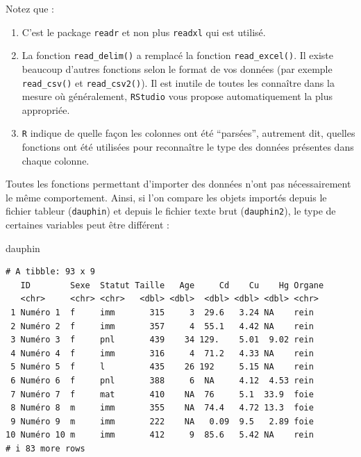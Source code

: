 \documentclass[
  a4paper,
  DIV=11,
  numbers=noendperiod,
  oneside]{scrreprt}
\newenvironment{Shaded}{}{}
\newcommand{\NormalTok}[1]{\textcolor[rgb]{0.14,0.16,0.18}{#1}}
\providecommand{\tightlist}{%
  \setlength{\itemsep}{0pt}\setlength{\parskip}{0pt}}\usepackage{longtable,booktabs,array}
\begin{document}
Notez que :

\begin{enumerate}
\def\labelenumi{\arabic{enumi}.}
\tightlist
\item
  C'est le package \texttt{readr} et non plus \texttt{readxl} qui est
  utilisé.
\item
  La fonction \texttt{read\_delim()} a remplacé la fonction
  \texttt{read\_excel()}. Il existe beaucoup d'autres fonctions selon le
  format de vos données (par exemple \texttt{read\_csv()} et
  \texttt{read\_csv2()}). Il est inutile de toutes les connaître dans la
  mesure où généralement, \texttt{RStudio} vous propose automatiquement
  la plus appropriée.
\item
  \texttt{R} indique de quelle façon les colonnes ont été ``parsées'',
  autrement dit, quelles fonctions ont été utilisées pour reconnaître le
  type des données présentes dans chaque colonne.
\end{enumerate}

Toutes les fonctions permettant d'importer des données n'ont pas
nécessairement le même comportement. Ainsi, si l'on compare les objets
importés depuis le fichier tableur (\texttt{dauphin}) et depuis le
fichier texte brut (\texttt{dauphin2}), le type de certaines variables
peut être différent :

\begin{Shaded}
\begin{Highlighting}[]
\NormalTok{dauphin}
\end{Highlighting}
\end{Shaded}

\begin{verbatim}
# A tibble: 93 x 9
   ID        Sexe  Statut Taille   Age     Cd    Cu    Hg Organe
   <chr>     <chr> <chr>   <dbl> <dbl>  <dbl> <dbl> <dbl> <chr> 
 1 Numéro 1  f     imm       315     3  29.6   3.24 NA    rein  
 2 Numéro 2  f     imm       357     4  55.1   4.42 NA    rein  
 3 Numéro 3  f     pnl       439    34 129.    5.01  9.02 rein  
 4 Numéro 4  f     imm       316     4  71.2   4.33 NA    rein  
 5 Numéro 5  f     l         435    26 192     5.15 NA    rein  
 6 Numéro 6  f     pnl       388     6  NA     4.12  4.53 rein  
 7 Numéro 7  f     mat       410    NA  76     5.1  33.9  foie  
 8 Numéro 8  m     imm       355    NA  74.4   4.72 13.3  foie  
 9 Numéro 9  m     imm       222    NA   0.09  9.5   2.89 foie  
10 Numéro 10 m     imm       412     9  85.6   5.42 NA    rein  
# i 83 more rows
\end{verbatim}
\end{document}
